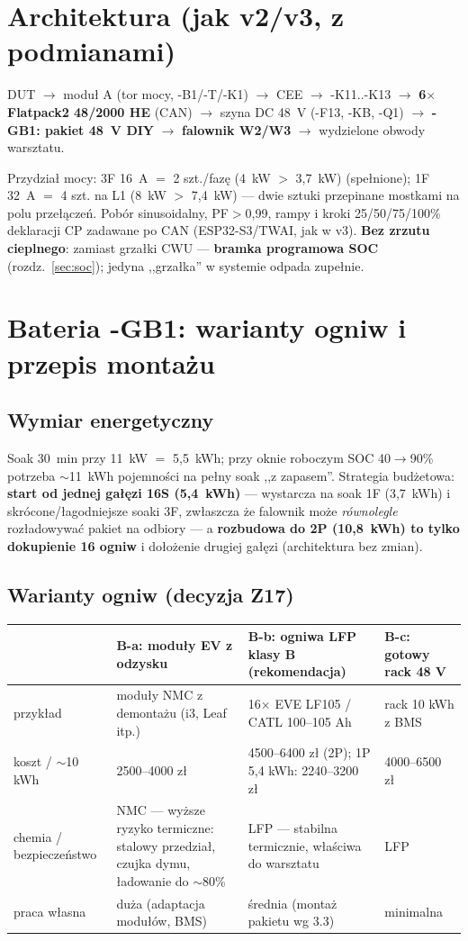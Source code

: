 \documentclass[11pt,a4paper]{article}
\begin{document}
\section{Architektura (jak v2/v3, z podmianami)}
\begin{center}\small
DUT $\to$ moduł A (tor mocy, -B1/-T/-K1) $\to$ CEE $\to$ -K11..-K13 $\to$
\textbf{6$\times$ Flatpack2 48/2000 HE} (CAN) $\to$ szyna DC 48~V (-F13, -KB, -Q1) $\to$
\textbf{-GB1: pakiet 48~V DIY} $\to$ \textbf{falownik W2/W3} $\to$ wydzielone obwody warsztatu.
\end{center}
Przydział mocy: 3F 16~A $=$ 2 szt./fazę (4~kW $>$ 3,7~kW) (spełnione); 1F 32~A $=$ 4 szt. na L1 (8~kW $>$
7,4~kW) --- dwie sztuki przepinane mostkami na polu przełączeń. Pobór sinusoidalny, PF$>$0,99,
rampy i kroki 25/50/75/100\% deklaracji CP zadawane po CAN (ESP32-S3/TWAI, jak w v3).
\textbf{Bez zrzutu cieplnego}: zamiast grzałki CWU --- \textbf{bramka programowa SOC}
(rozdz.~\ref{sec:soc}); jedyna ,,grzałka'' w systemie odpada zupełnie.

\section{Bateria -GB1: warianty ogniw i przepis montażu}
\label{sec:bat}
\subsection{Wymiar energetyczny}
Soak 30~min przy 11~kW $=$ 5,5~kWh; przy oknie roboczym SOC 40$\to$90\% potrzeba $\sim$11~kWh
pojemności na pełny soak ,,z zapasem''. Strategia budżetowa: \textbf{start od jednej gałęzi 16S
(5,4~kWh)} --- wystarcza na soak 1F (3,7~kWh) i skrócone/łagodniejsze soaki 3F, zwłaszcza że
falownik może \emph{równolegle} rozładowywać pakiet na odbiory --- a \textbf{rozbudowa do 2P
(10,8~kWh) to tylko dokupienie 16 ogniw} i dołożenie drugiej gałęzi (architektura bez zmian).

\subsection{Warianty ogniw (decyzja Z17)}
\begin{longtable}{@{}p{}p{}p{}p{}@{}}
\toprule
 & \textbf{B-a: moduły EV z odzysku} & \textbf{B-b: ogniwa LFP klasy B (rekomendacja)} & \textbf{B-c: gotowy rack 48 V}\\
\midrule
przykład & moduły NMC z demontażu (i3, Leaf itp.) & 16$\times$ EVE LF105 / CATL 100--105 Ah & rack 10 kWh z BMS\\
koszt / $\sim$10 kWh & 2500--4000 zł & 4500--6400 zł (2P); 1P 5,4 kWh: 2240--3200 zł & 4000--6500 zł\\
chemia / bezpieczeństwo & NMC --- wyższe ryzyko termiczne: stalowy przedział, czujka dymu, ładowanie do $\sim$80\% & LFP --- stabilna termicznie, właściwa do warsztatu & LFP\\
praca własna & duża (adaptacja modułów, BMS) & średnia (montaż pakietu wg 3.3) & minimalna\\
\bottomrule
\end{longtable}
\end{document}

